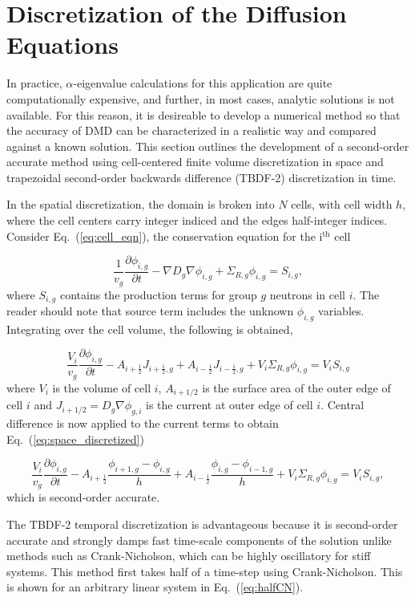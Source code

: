 \documentclass[12pt]{article}
\newcommand{\dxdt}[1]{\frac{\partial #1}{\partial t}}
\newcommand{\be}{\begin{equation}}
\newcommand{\ee}{\end{equation}}
\newcommand{\LEQ}[1]{\label{eq:#1}}
\newcommand{\EQ}[1]{Eq.~(\ref{eq:#1})}
\newcommand{\half}{\frac{1}{2}}
\begin{document}
\section{Discretization of the Diffusion Equations}
In practice,  $\alpha$-eigenvalue calculations for this application are quite computationally expensive, and  further, in most cases, analytic solutions is not available. For this reason, it is desireable to develop a numerical method so that the accuracy of DMD can be characterized in a realistic way and compared against a known solution. This section outlines the development of a second-order accurate method using cell-centered finite volume discretization in space and trapezoidal second-order backwards difference (TBDF-2) discretization in time.

In the spatial discretization, the domain is broken into $N$ cells, with cell width $h$, where the cell centers carry integer indiced and the edges half-integer indices. Consider \EQ{cell_eqn}, the conservation equation for the i$^{\text{th}}$ cell

\be
	 \frac{1}{v_g} \dxdt{\phi_{i,g}} - \nabla D_{g} \nabla \phi_{i,g} + \Sigma_{R,g} \phi_{i,g}  =  S_{i,g},
\LEQ{cell_eqn} \ee
where $S_{i,g}$ contains the production terms for group $g$ neutrons in cell $i$. The reader should note that source term includes the unknown $ \phi_{i,g} $ variables. Integrating over the cell volume, the following is obtained,

\be
	\frac{V_i}{v_g} \dxdt{\phi_{i,g}} - A_{i+\half} J_{i+\half,g} + A_{i-\half} J_{i-\half,g} + V_i \Sigma_{R,g} \phi_{i,g} = V_i S_{i,g}
\ee
where $V_i $ is the volume of cell $i$, $ A_{i+1/2} $ is the surface area of the outer edge of cell $i$ and $ J_{i+1/2} = D_g \nabla \phi_{g,i} $ is the current at outer edge of cell $i$. Central difference is now applied to the current terms to obtain \EQ{space_discretized}

\be
	\frac{V_i}{v_g} \dxdt{\phi_{i,g}} - A_{i+\half} \frac{\phi_{i+1,g} - \phi_{i,g}}{h} + A_{i-\half} \frac{\phi_{i,g} - \phi_{i-1,g}}{h} + V_i \Sigma_{R,g} \phi_{i,g} = V_i S_{i,g},
 \LEQ{space_discretized} \ee
 which is second-order accurate.

The TBDF-2 temporal discretization is advantageous because it is second-order accurate and strongly damps fast time-scale components of the solution unlike methods such as Crank-Nicholson, which can be highly oscillatory for stiff systems. This method first takes half of a time-step using Crank-Nicholson. This is shown for an arbitrary linear system in \EQ{halfCN}. 
\end{document}
